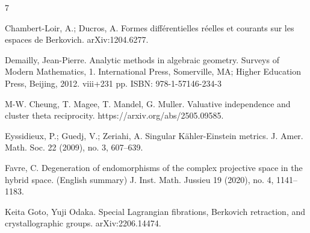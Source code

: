 \documentclass[a4paper]{article}
\theoremstyle{definition}
\begin{document}
\begin{thebibliography}{7}
			
			
			
			
			
			
			
			
			
			
			Chambert-Loir,  A.; Ducros, A. 
			Formes différentielles réelles et courants sur les espaces de Berkovich. 	arXiv:1204.6277.
			
			
			
			Demailly, Jean-Pierre. Analytic methods in algebraic geometry. Surveys of Modern Mathematics, 1. International Press, Somerville, MA; Higher Education Press, Beijing, 2012. viii+231 pp. ISBN: 978-1-57146-234-3
			
			
			
			
			  M-W. Cheung, T. Magee, T. Mandel, G. Muller. Valuative independence and cluster theta reciprocity. https://arxiv.org/abs/2505.09585.
			
			
			
			
			
			
			
			
			Eyssidieux, P.; Guedj, V.; Zeriahi, A. Singular Kähler-Einstein metrics. J. Amer. Math. Soc. 22 (2009), no. 3, 607--639.
			
			
			
			
			Favre, C. 
			Degeneration of endomorphisms of the complex projective space in the hybrid space. (English summary)
			J. Inst. Math. Jussieu 19 (2020), no. 4, 1141–1183. 
			
			
			
			
			Keita Goto, Yuji Odaka. Special Lagrangian fibrations, Berkovich retraction, and crystallographic groups.  	arXiv:2206.14474.
			
			
			
			
	

\end{thebibliography}
\end{document}
